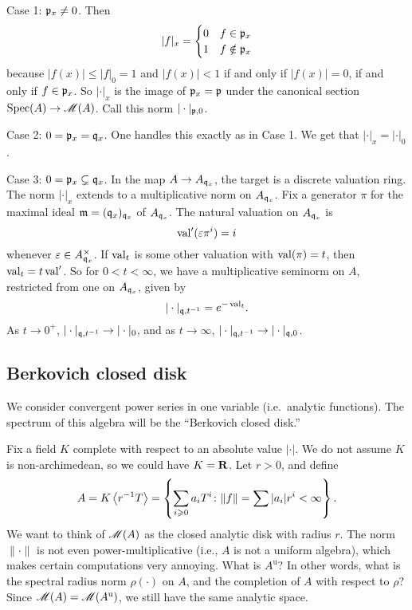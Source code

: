 Case 1: $\mathfrak{p}_x\ne 0$. Then
\[
	|f| _x= \begin{cases} 0 & f\in \mathfrak{p}_x \\ 1 & f\notin \mathfrak{p}_x \end{cases}
\]
because $|f(x)| \leqslant |f|_0 = 1$ and $|f(x)|<1$ if and only if $|f(x)|=0$, 
if and only if $f\in \mathfrak{p}_x$. So $|\cdot|_x$ is the image of $\mathfrak{p}_x=\mathfrak{p}$ under 
the canonical section $\operatorname{Spec}(A)\to \operatorname{\mathscr{M}}(A)$. Call this norm 
$|\cdot|_{\mathfrak{p},0}$. 

Case 2: $0=\mathfrak{p}_x= \mathfrak{q}_x$. One handles this exactly as in Case 1. We get that 
$|\cdot|_x=|\cdot|_0$. 

Case 3: $0=\mathfrak{p}_x\subsetneq \mathfrak{q}_x$. In the map $A\to A_{\mathfrak{q}_x}$, the target is 
a discrete valuation ring. The norm $|\cdot|_x$ extends to a multiplicative 
norm on $A_{\mathfrak{q}_x}$. Fix a generator $\pi$ for the maximal ideal 
$\mathfrak{m}=(\mathfrak{q}_x)_{\mathfrak{q}_x}$ of $A_{\mathfrak{q}_x}$. The natural valuation on $A_{\mathfrak{q}_x}$ is 
\[
	\operatorname{val}'(\varepsilon \pi^i) = i 
\]
whenever $\varepsilon\in A_{\mathfrak{q}_x}^\times$. If $\operatorname{val}_t$ is some other 
valuation with $\operatorname{val}(\pi)=t$, then $\operatorname{val}_t=t\operatorname{val}'$. So for 
$0<t<\infty$, we have a multiplicative seminorm on $A$, restricted from one on 
$A_{\mathfrak{q}_x}$, given by 
\[
	|\cdot|_{\mathfrak{q},t^{-1}} = e^{-\operatorname{val}_t} .
\]
As $t\to 0^+$, $|\cdot|_{\mathfrak{q},t^{-1}}\to |\cdot|_0$, and as $t\to \infty$, 
$|\cdot|_{\mathfrak{q},t^{-1}} \to |\cdot|_{\mathfrak{q},0}$. 





\subsection{Berkovich closed disk}

We consider convergent power series in one variable (i.e.~analytic functions). 
The spectrum of this algebra will be the ``Berkovich closed disk.''

Fix a field $K$ complete with respect to an absolute value $|\cdot|$. We do not 
assume $K$ is non-archimedean, so we could have $K=\mathbf{R}$. Let $r>0$, and define 
\[
	A = K\left\langle r^{-1} T \right\rangle = \left\{\sum_{i\geqslant 0} a_i T^i\colon \|f\| = \sum |a_i| r^i < \infty \right\} .
\]
We want to think of $\operatorname{\mathscr{M}}(A)$ as the closed analytic disk with radius $r$. 
The norm $\|\cdot\|$ is not even power-multiplicative (i.e., $A$ is not a 
uniform algebra), which makes certain computations very annoying. What is 
$A^\mathrm{u}$? In other words, what is the spectral radius norm $\rho(\cdot)$ 
on $A$, and the completion of $A$ with respect to $\rho$? Since 
$\operatorname{\mathscr{M}}(A)=\operatorname{\mathscr{M}}(A^\mathrm{u})$, we still have the same analytic 
space. 

